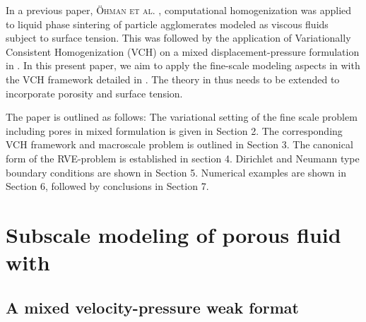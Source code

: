 \documentclass[12pt,a4paper]{article}
\begin{document}
%
%
In a previous paper, \textsc{\"Ohman et al.} \cite{ohman_computational_2013}, computational homogenization was applied to liquid phase sintering of particle agglomerates modeled as viscous fluids subject to surface tension.
This was followed by the application of Variationally Consistent Homogenization (VCH) on a mixed displacement-pressure formulation in \cite{ohman_variationally_2014}.
In this present paper, we aim to apply the fine-scale modeling aspects in \cite{ohman_computational_2013} with the VCH framework detailed in \cite{ohman_variationally_2014}.
The theory in \cite{ohman_variationally_2014} thus needs to be extended to incorporate porosity and surface tension.




% 

The paper is outlined as follows:
The variational setting of the fine scale problem including pores in mixed formulation is given in Section 2.
The corresponding VCH framework and macroscale problem is outlined in Section 3.
The canonical form of the RVE-problem is established in section 4.
Dirichlet and Neumann type boundary conditions are shown in Section 5.
Numerical examples are shown in Section 6, followed by conclusions in Section 7.

\section{Subscale modeling of porous fluid with }

\subsection{A mixed velocity-pressure weak format}
\end{document}
